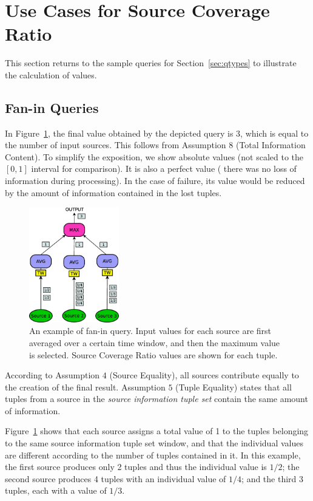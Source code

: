 \section{Use Cases for Source Coverage Ratio}
\label{sec:apps}

This section returns to the sample queries for Section~\ref{sec:qtypes} to illustrate the
calculation of \sic values.
\vspace{-10pt}
\subsection*{Fan-in Queries}

In Figure~\ref{fig:query_fanin2}, the final \sic value obtained by the depicted query is $3$, which is
equal to the number of input sources.
This follows from Assumption $8$ (Total Information Content). To simplify the exposition, we show
absolute values (\ie not scaled to the $[0,1]$ interval for comparison). It is also a perfect value (\ie
there was no loss of information during processing). In the case of failure, its value
would be reduced by the amount of information contained in the lost tuples.\\
\begin{figure}[h!] \centering \includegraphics[width=0.35\textwidth]{img/tesi/query_fanin} \caption{An
example of fan-in query. Input values for each source are first averaged over a certain time window, and
then the maximum value is selected. Source Coverage Ratio values are shown for each tuple.}
	\label{fig:query_fanin2}
\end{figure}

According to Assumption $4$ (Source Equality), all sources contribute equally to the creation of the
final result.
Assumption $5$ (Tuple Equality) states that all tuples from a source in the \textit{source
information tuple set} contain the same amount of information. 

Figure~\ref{fig:query_fanin2} shows that
each source assigns a total value of 1 to the tuples belonging to the same source information tuple set window, and
that the individual \sic values are different according to the number of tuples contained in it. In this
example, the first source produces only 2 tuples and thus the individual \sic value is $1/2$; the second
source produces 4 tuples with an individual value of $1/4$; and the third 3 tuples, each with a value of
$1/3$.

